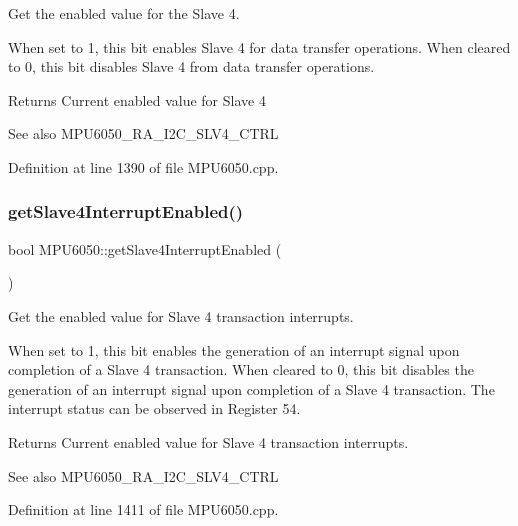 Get the enabled value for the Slave 4. 

When set to 1, this bit enables Slave 4 for data transfer operations. When cleared to 0, this bit disables Slave 4 from data transfer operations. \begin{DoxyReturn}{Returns}
Current enabled value for Slave 4 
\end{DoxyReturn}
\begin{DoxySeeAlso}{See also}
M\+P\+U6050\+\_\+\+R\+A\+\_\+\+I2\+C\+\_\+\+S\+L\+V4\+\_\+\+C\+T\+RL 
\end{DoxySeeAlso}


Definition at line 1390 of file M\+P\+U6050.\+cpp.

\mbox{\label{classMPU6050_a051549bcfa2eeb848c8557fc3efe74da}} 
\subsubsection{\texorpdfstring{getSlave4InterruptEnabled()}{getSlave4InterruptEnabled()}}
{\footnotesize\ttfamily bool M\+P\+U6050\+::get\+Slave4\+Interrupt\+Enabled (\begin{DoxyParamCaption}{ }\end{DoxyParamCaption})}



Get the enabled value for Slave 4 transaction interrupts. 

When set to 1, this bit enables the generation of an interrupt signal upon completion of a Slave 4 transaction. When cleared to 0, this bit disables the generation of an interrupt signal upon completion of a Slave 4 transaction. The interrupt status can be observed in Register 54.

\begin{DoxyReturn}{Returns}
Current enabled value for Slave 4 transaction interrupts. 
\end{DoxyReturn}
\begin{DoxySeeAlso}{See also}
M\+P\+U6050\+\_\+\+R\+A\+\_\+\+I2\+C\+\_\+\+S\+L\+V4\+\_\+\+C\+T\+RL 
\end{DoxySeeAlso}


Definition at line 1411 of file M\+P\+U6050.\+cpp.

\mbox{\label{classMPU6050_a105aefe645e7021f9ba4397e9df4114c}} 

